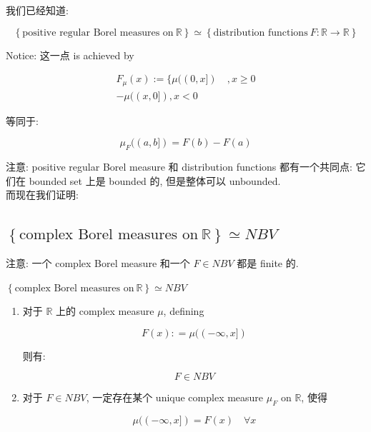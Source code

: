 \documentclass{qlnotes-export}
\begin{document}
我们已经知道:

\[\left\{ {\text{positive regular Borel measures on}\ {\mathbb{R}}} \right\} \simeq \left\{ {\text{distribution functions}\ F:{\mathbb{R}}\rightarrow{\mathbb{R}}} \right\}\]

Notice: 这一点 is achieved by

\[\begin{matrix}
{F_{\mu}(x) := \{\mu((0,x\rbrack)\quad,x \geq 0} \\
{- \mu((x,0\rbrack),x < 0}
\end{matrix}\]

等同于:

\[\mu_{F}((a,b\rbrack) = F(b) - F(a)\]

注意: positive regular Borel measure 和 distribution functions 都有一个共同点: 它们在 bounded set 上是 bounded 的, 但是整体可以 unbounded.\\
而现在我们证明:

\subsection{\texorpdfstring{\(\left\{ {\text{complex Borel measures on}\ {\mathbb{R}}} \right\} \simeq NBV\)}{\textbackslash left\textbackslash\{ \{\textbackslash text\{complex Borel measures on\}\textbackslash{} \{\textbackslash mathbb\{R\}\}\} \textbackslash right\textbackslash\} \textbackslash simeq NBV}}\label{left-textcomplex-borel-measures-on-mathbbr-right-simeq-nbv}

注意: 一个 complex Borel measure 和一个 \(F \in NBV\) 都是 finite 的.

\begin{theorem}{\(\left\{ {\text{complex Borel measures on}\ {\mathbb{R}}} \right\} \simeq NBV\)}\label{thm-12-differentiation-on-real-spaces-text-complex-borel-measures-on-mathbb-r-simeq-nbv}

\begin{enumerate}
\item
  对于 \(\mathbb{R}\) 上的 complex measure \(\mu\), defining

  \[F(x): = \mu(( - \infty,x\rbrack)\]

  则有:

  \[F \in NBV\]
\item
  对于 \(F \in NBV\), 一定存在某个 unique complex measure \(\mu_{F}\) on \(\mathbb{R}\), 使得

  \[\mu(( - \infty,x\rbrack) = F(x)\quad\forall x\]
\end{enumerate}

\end{theorem}
\end{document}
